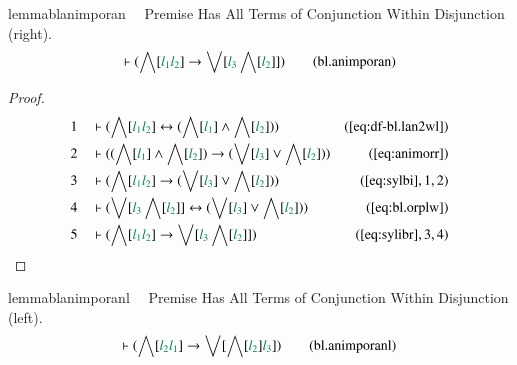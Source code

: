 \begin{restatable}{lemma}{blanimporan}~~ Premise Has All Terms of Conjunction
Within Disjunction (right).
\begin{align}
\vdash ( \bigwedge[ \mwl{l_1} \mwl{l_2} ] \rightarrow \bigvee[ \mwl{l_3}
    \bigwedge[ \mwl{l_2} ] ] )\label{eq:bl.animporan}\tag{bl.animporan}
\end{align}
\end{restatable}

\begin{proof}
\begin{align}
  1 &&  & \vdash ( \bigwedge[ \mwl{l_1} \mwl{l_2} ] \leftrightarrow (
      \bigwedge[ \mwl{l_1} ] \wedge \bigwedge[ \mwl{l_2} ]
      ) )&(\mbox{\ref{eq:df-bl.lan2wl}})\notag
  \\ 2 &&  & \vdash ( ( \bigwedge[ \mwl{l_1} ] \wedge \bigwedge[ \mwl{l_2} ] )
      \rightarrow ( \bigvee[ \mwl{l_3} ] \vee \bigwedge[
      \mwl{l_2} ] ) )&(\mbox{\ref{eq:animorr}})\notag
  \\ 3 &&  & \vdash ( \bigwedge[ \mwl{l_1} \mwl{l_2} ] \rightarrow ( \bigvee[
      \mwl{l_3} ] \vee \bigwedge[ \mwl{l_2} ] )
      )&(\mbox{\ref{eq:sylbi}},1,2)\notag
  \\ 4 &&  & \vdash ( \bigvee[ \mwl{l_3} \bigwedge[ \mwl{l_2} ] ]
      \leftrightarrow ( \bigvee[ \mwl{l_3} ] \vee
      \bigwedge[ \mwl{l_2} ] )
      )&(\mbox{\ref{eq:bl.orplw}})\notag
  \\ 5 &&  & \vdash ( \bigwedge[ \mwl{l_1} \mwl{l_2} ] \rightarrow \bigvee[
      \mwl{l_3} \bigwedge[ \mwl{l_2} ] ]
      )&(\mbox{\ref{eq:sylibr}},3,4)\notag
\end{align}
\end{proof}

\begin{restatable}{lemma}{blanimporanl}~~ Premise Has All Terms of Conjunction
Within Disjunction (left).
\begin{align}
\vdash ( \bigwedge[ \mwl{l_2} \mwl{l_1} ] \rightarrow \bigvee[ \bigwedge[
    \mwl{l_2} ] \mwl{l_3} ] )\label{eq:bl.animporanl}\tag{bl.animporanl}
\end{align}
\end{restatable}

